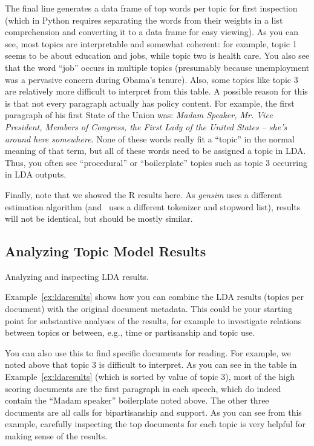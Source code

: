 The final line generates a data frame of top words per topic for first inspection
(which in Python requires separating the words from their weights in a list comprehension and converting it to a data frame for easy viewing).
As you can see, most topics are interpretable and somewhat coherent: for example, topic 1 seems to be about education and jobs,
while topic two is health care. You also see that the word ``job'' occurs in multiple topics (presumably because unemployment was a pervasive concern during Obama's tenure).
Also, some topics like topic 3 are relatively more difficult to interpret from this table.
A possible reason for this is that not every paragraph actually has policy content.
For example, the first paragraph of his first State of the Union was:
\emph{Madam Speaker, Mr. Vice President, Members of Congress, the First Lady of the United States -- she's around here somewhere}.
None of these words really fit a ``topic'' in the normal meaning of that term,
but all of these words need to be assigned a topic in LDA.
Thus, you often see ``procedural'' or ``boilerplate'' topics such as topic 3 occurring in LDA outputs.

Finally, note that we showed the R results here. As \emph{gensim} uses a different estimation algorithm
(and \sklearn\ uses a different tokenizer and stopword list), results will not be identical,
but should be mostly similar.

\subsection{Analyzing Topic Model Results}

\begin{ccsexample}
\caption{Analyzing and inspecting LDA results.}\label{ex:ldaresults}
\end{ccsexample}


Example~\ref{ex:ldaresults} shows how you can combine the LDA results (topics per document)
with the original document metadata.
This could be your starting point for substantive analyses of the results,
for example to investigate relations between topics or between, e.g., time or partisanship and topic use.

You can also use this to find specific documents for reading.
For example, we noted above that topic 3 is difficult to interpret.
As you can see in the table in Example~\ref{ex:ldaresults} (which is sorted by value of topic 3),
most of the high scoring documents are the first paragraph in each speech,
which do indeed contain the ``Madam speaker'' boilerplate noted above.
The other three documents are all calls for bipartisanship and support.
As you can see from this example, carefully inspecting the top documents for each topic
is very helpful for making sense of the results.


